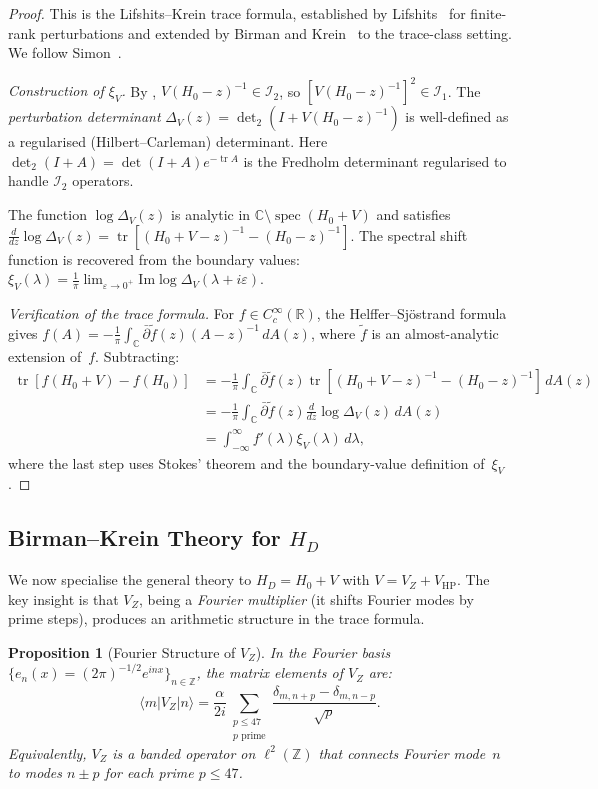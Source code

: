 \documentclass[11pt,a4paper]{article}
\theoremstyle{plain}
\newtheorem{proposition}[theorem]{Proposition}
\theoremstyle{remark}
\newcommand{\Z}{\mathbb{Z}}
\newcommand{\C}{\mathbb{C}}
\newcommand{\R}{\mathbb{R}}
\DeclareMathOperator{\tr}{tr}
\DeclareMathOperator{\spec}{spec}
\begin{document}
\begin{proof}
This is the Lifshits--Krein trace formula, established by
Lifshits~\cite{lifshits1952} for finite-rank perturbations and extended by
Birman and Krein~\cite{birman-krein1962} to the trace-class setting.
We follow Simon~\cite{simon2005}.

\emph{Construction of $\xi_V$.}
By , $V(H_0-z)^{-1}\in\mathcal{I}_2$, so
$[V(H_0-z)^{-1}]^2\in\mathcal{I}_1$.  The \emph{perturbation determinant}
$\Delta_V(z)=\det_2(I+V(H_0-z)^{-1})$
is well-defined as a regularised (Hilbert--Carleman) determinant.
Here $\det_2(I+A)=\det(I+A)e^{-\tr A}$ is the Fredholm determinant
regularised to handle $\mathcal{I}_2$ operators.

The function $\log\Delta_V(z)$ is analytic in
$\C\setminus\spec(H_0+V)$ and satisfies
$\frac{d}{dz}\log\Delta_V(z)=\tr[(H_0+V-z)^{-1}-(H_0-z)^{-1}]$.
The spectral shift function is recovered from the boundary values:
$\xi_V(\lambda)=\frac{1}{\pi}\lim_{\varepsilon\to 0^+}
\mathrm{Im}\log\Delta_V(\lambda+i\varepsilon)$.

\emph{Verification of the trace formula.}
For $f\in C_c^\infty(\R)$, the Helffer--Sj\"ostrand formula gives
$f(A)=-\frac{1}{\pi}\int_\C\bar\partial\tilde{f}(z)(A-z)^{-1}\,dA(z)$,
where $\tilde{f}$ is an almost-analytic extension of~$f$.  Subtracting:
\begin{align*}
  \tr[f(H_0+V)-f(H_0)]
  &=-\frac{1}{\pi}\int_\C\bar\partial\tilde{f}(z)
  \tr[(H_0+V-z)^{-1}-(H_0-z)^{-1}]\,dA(z)\\
  &=-\frac{1}{\pi}\int_\C\bar\partial\tilde{f}(z)
  \frac{d}{dz}\log\Delta_V(z)\,dA(z)\\
  &=\int_{-\infty}^\infty f'(\lambda)\xi_V(\lambda)\,d\lambda,
\end{align*}
where the last step uses Stokes' theorem and the boundary-value definition
of~$\xi_V$.
\end{proof}

\subsection{Birman--Krein Theory for $H_D$}

We now specialise the general theory to $H_D=H_0+V$ with
$V=V_Z+V_{\mathrm{HP}}$.  The key insight is that $V_Z$, being a
\emph{Fourier multiplier} (it shifts Fourier modes by prime steps),
produces an arithmetic structure in the trace formula.

\begin{proposition}[Fourier Structure of $V_Z$]\label{prop:VZ-fourier}
In the Fourier basis $\{e_n(x)=(2\pi)^{-1/2}e^{inx}\}_{n\in\Z}$, the
matrix elements of $V_Z$ are:
\begin{equation}\label{eq:VZ-matrix}
  \langle m|V_Z|n\rangle = \frac{\alpha}{2i}\sum_{\substack{p\leq 47\\p\text{ prime}}}
  \frac{\delta_{m,n+p}-\delta_{m,n-p}}{\sqrt{p}}.
\end{equation}
Equivalently, $V_Z$ is a banded operator on $\ell^2(\Z)$ that connects
Fourier mode~$n$ to modes $n\pm p$ for each prime $p\leq 47$.
\end{proposition}
\end{document}
